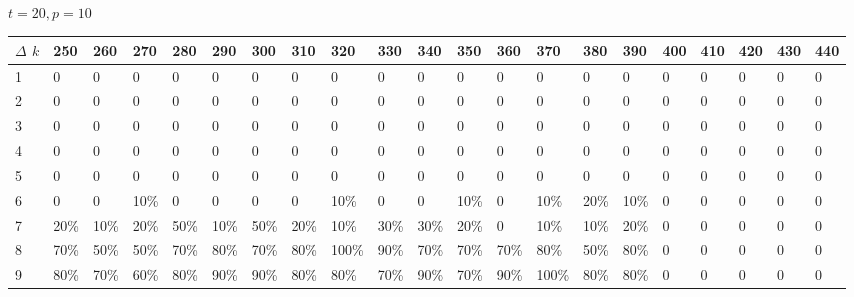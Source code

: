 \documentclass[11pt]{article}
\begin{document}
\paragraph{}
$t =  20, p =  10$
\begin{center} \tiny \begin{tabular}{|l |l |l |l |l |l |l |l |l |l |l |l |l |l |l |l |l |l |l |l |l |} \hline
$\Delta$ $k$ &250 & 260 & 270 & 280 & 290 & 300 & 310 & 320 & 330 & 340 & 350 & 360 & 370 & 380 & 390 & 400 & 410 & 420 & 430 & 440  \\ \hline
1 & 0 & 0 & 0 & 0 & 0 & 0 & 0 & 0 & 0 & 0 & 0 & 0 & 0 & 0 & 0 & 0 & 0 & 0 & 0 & 0  \\ \hline
2 & 0 & 0 & 0 & 0 & 0 & 0 & 0 & 0 & 0 & 0 & 0 & 0 & 0 & 0 & 0 & 0 & 0 & 0 & 0 & 0  \\ \hline
3 & 0 & 0 & 0 & 0 & 0 & 0 & 0 & 0 & 0 & 0 & 0 & 0 & 0 & 0 & 0 & 0 & 0 & 0 & 0 & 0  \\ \hline
4 & 0 & 0 & 0 & 0 & 0 & 0 & 0 & 0 & 0 & 0 & 0 & 0 & 0 & 0 & 0 & 0 & 0 & 0 & 0 & 0  \\ \hline
5 & 0 & 0 & 0 & 0 & 0 & 0 & 0 & 0 & 0 & 0 & 0 & 0 & 0 & 0 & 0 & 0 & 0 & 0 & 0 & 0  \\ \hline
6 & 0 & 0 & 10\% & 0 & 0 & 0 & 0 & 10\% & 0 & 0 & 10\% & 0 & 10\% & 20\% & 10\% & 0 & 0 & 0 & 0 & 0  \\ \hline
7 & 20\% & 10\% & 20\% & 50\% & 10\% & 50\% & 20\% & 10\% & 30\% & 30\% & 20\% & 0 & 10\% & 10\% & 20\% & 0 & 0 & 0 & 0 & 0  \\ \hline
8 & 70\% & 50\% & 50\% & 70\% & 80\% & 70\% & 80\% & 100\% & 90\% & 70\% & 70\% & 70\% & 80\% & 50\% & 80\% & 0 & 0 & 0 & 0 & 0  \\ \hline
9 & 80\% & 70\% & 60\% & 80\% & 90\% & 90\% & 80\% & 80\% & 70\% & 90\% & 70\% & 90\% & 100\% & 80\% & 80\% & 0 & 0 & 0 & 0 & 0  \\ \hline
\end{tabular}\end{center}
\end{document}
